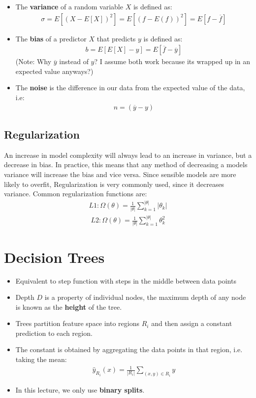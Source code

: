 \documentclass{report}
\newcommand{\tbf}{\textbf}
\newcommand{\yhat}{\hat{y}}
\begin{document}
\begin{itemize}
 \item The \tbf{variance} of a random variable $X$ is defined as:
 \begin{align}
  \sigma = E[(X - E[X])^2] = E[(f - E(f))^2] = E[f - \overline{f}]
 \end{align}
 \item The \tbf{bias} of a predictor $X$ that predicts $y$ is defined as:
 \begin{align}
  b = E[E[X] - y] = E[\overline{f} - \overline{y}]
 \end{align}
 (Note: Why $\overline{y}$ instead of $y$? I assume both work because its wrapped up in an expected value anyways?)
 \item The \tbf{noise} is the difference in our data from the expected value of the data, i.e:
 \begin{align}
  n = (\overline{y} - y)
 \end{align}
\end{itemize}
\section{Regularization}
An increase in model complexity will always lead to an increase in variance, but a decrease in bias. In practice, this means that any method of decreasing a models variance will increase the bias and vice versa. Since sensible models are more likely to overfit, Regularization is very commonly used, since it decreases variance. Common regularization functions are:
\begin{align}
 L1: \Omega(\theta) = \frac{1}{|\theta|} \sum_{k=1}^{|\theta|} |\theta_k|
\end{align}
\begin{align}
 L2: \Omega(\theta) = \frac{1}{|\theta|} \sum_{k=1}^{|\theta|} \theta_k^2
\end{align}
\chapter{Decision Trees}
\begin{itemize}
 \item Equivalent to step function with steps in the middle between data points
 \item Depth $D$ is a property of individual nodes, the maximum depth of any node is known as the \tbf{height} of the tree.
 \item Trees partition feature space into regions $R_i$ and then assign a constant prediction to each region.
 \item The constant is obtained by aggregating the data points in that region, i.e. taking the mean:
 \begin{align}
  \yhat_{R_i}(x) = \frac{1}{|R_i|} \sum_{(x,y) \in R_i} y
 \end{align}

 \item In this lecture, we only use \tbf{binary splits}.
\end{itemize}
\end{document}
